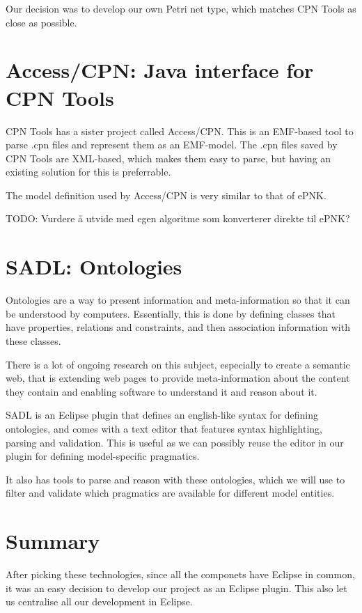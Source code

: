 Our decision was to develop our own Petri net type, which matches CPN Tools as
close as possible.

\section{Access/CPN: Java interface for CPN Tools}
CPN Tools has a sister project called Access/CPN. This is an
EMF-based tool to parse .cpn files and represent them as an
EMF-model. The .cpn files saved by CPN Tools are XML-based, which makes them
easy to parse, but having an existing solution for this is preferrable.

The model definition used by Access/CPN is very similar to that of ePNK.

TODO: Vurdere å utvide med egen algoritme som konverterer direkte til ePNK?

\section{SADL: Ontologies}
Ontologies are a way to present information and meta-information so that it can
be understood by computers. Essentially, this is done by defining classes that
have properties, relations and constraints, and then association
information with these classes.

There is a lot of ongoing research on this subject, especially to create a
semantic web, that is extending web pages to provide meta-information about the
content they contain and enabling software to understand it and reason about it. 

SADL is an Eclipse plugin that defines an english-like syntax for defining
ontologies, and comes with a text editor that features syntax highlighting,
parsing and validation. This is useful as we can possibly reuse the editor in
our plugin for defining model-specific pragmatics.

It also has tools to parse and reason with these ontologies, which we will use
to filter and validate which pragmatics are available for different model
entities.

\section{Summary}
After picking these technologies, since all the componets have Eclipse in
common, it was an easy decision to develop our project as an Eclipse plugin.
This also let us centralise all our development in Eclipse.
